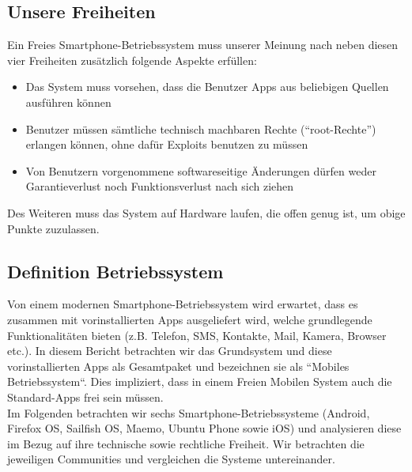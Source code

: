 \subsection{Unsere Freiheiten}
Ein Freies Smartphone-Betriebssystem muss unserer Meinung nach neben diesen vier Freiheiten zusätzlich folgende Aspekte erfüllen:
\begin{itemize}
	\renewcommand\labelitemi{--}
	\item Das System muss vorsehen, dass die Benutzer Apps aus beliebigen Quellen ausführen können
	\item Benutzer müssen sämtliche technisch machbaren Rechte (\mbox{``root-Rechte''}) erlangen können, ohne dafür Exploits benutzen zu müssen
	\item Von Benutzern vorgenommene softwareseitige Änderungen dürfen weder Garantieverlust noch Funktionsverlust nach sich ziehen
\end{itemize}
Des Weiteren muss das System auf Hardware laufen, die offen genug ist, um obige Punkte zuzulassen.
\newline

\subsection{Definition Betriebssystem}
Von einem modernen Smartphone-Betriebssystem wird erwartet, dass es zusammen mit vorinstallierten Apps ausgeliefert wird, welche grundlegende Funktionalitäten bieten (z.B. Telefon, SMS, Kontakte, Mail, Kamera, Browser etc.). In diesem Bericht betrachten wir das Grundsystem und diese vorinstallierten Apps als Gesamtpaket und bezeichnen sie als ``Mobiles Betriebssystem“. Dies impliziert, dass in einem Freien Mobilen System auch die Standard-Apps frei sein müssen.\\

Im Folgenden betrachten wir sechs Smartphone-Betriebssysteme (Android, Firefox OS, Sailfish OS, Maemo, Ubuntu Phone sowie iOS) und analysieren diese im Bezug auf ihre technische sowie rechtliche Freiheit. Wir betrachten die jeweiligen Communities und vergleichen die Systeme untereinander.